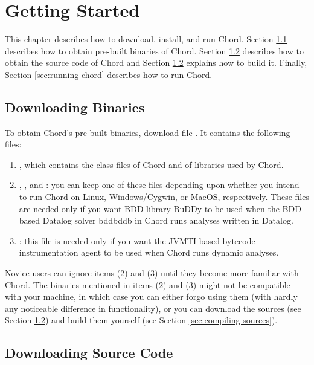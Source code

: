 \chapter{Getting Started}
\label{chap:getting-started}

This chapter describes how to download, install, and run Chord.
Section \ref{sec:downloading-binaries} describes how to obtain pre-built binaries of Chord.
Section \ref{sec:downloading-sources} describes how to obtain the source code of Chord
and Section \ref{sec:downloading-sources} explains how to build it.
Finally, Section \ref{sec:running-chord} describes how to run Chord.

\section{Downloading Binaries}
\label{sec:downloading-binaries}

To obtain Chord's pre-built binaries, download file .
It contains the following files:

\begin{enumerate}
\item
{}, which contains the class files of Chord and of libraries used by Chord.
\item
{}, , and : you can keep one of these files
depending upon whether you intend to run Chord on Linux, Windows/Cygwin, or MacOS, respectively.
These files are needed only if you want BDD library BuDDy to be used when 
the BDD-based Datalog solver bddbddb in Chord runs analyses written in Datalog.
\item
{}: this file is needed only if you want the JVMTI-based bytecode
instrumentation agent to be used when Chord runs dynamic analyses.
\end{enumerate}

Novice users can ignore items (2) and (3) until they become more familiar with Chord.
The binaries mentioned in items (2) and (3) might not be compatible with your machine, in which case you
can either forgo using them (with hardly any noticeable difference in functionality),
or you can download the sources (see Section \ref{sec:downloading-sources}) and build them yourself
(see Section \ref{sec:compiling-sources}).

\section{Downloading Source Code}
\label{sec:downloading-sources}


